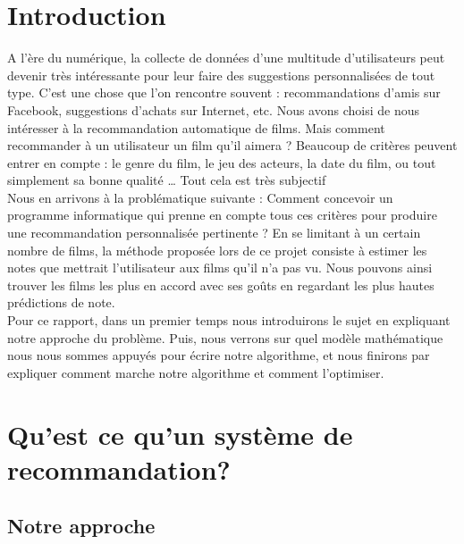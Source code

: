 \documentclass[a4paper,10pt]{article}
\begin{document}
\renewcommand{\contentsname}{Sommaire}
\tableofcontents
\newpage

\renewcommand{\thepage}{\arabic{page}}
\setcounter{page}{1}

\section*{Introduction}

A l’ère du numérique, la collecte de données d’une multitude d’utilisateurs peut devenir très intéressante pour leur faire des suggestions 
personnalisées de tout type. C’est une chose que l’on rencontre souvent : recommandations d’amis sur Facebook, suggestions d’achats sur Internet, etc.
Nous avons choisi de nous intéresser à la recommandation automatique de films.
Mais comment recommander à un utilisateur un film qu’il aimera ? Beaucoup de critères peuvent entrer en compte : 
le genre du film, le jeu des acteurs, la date du film, ou tout simplement sa bonne qualité … Tout cela est très subjectif \! \\


Nous en arrivons à la problématique suivante : Comment concevoir un programme informatique 
qui prenne en compte tous ces critères pour produire une recommandation personnalisée pertinente ?
En se limitant à un certain nombre de films, la méthode proposée lors de ce projet consiste à estimer les notes que mettrait l’utilisateur aux films qu'il n'a pas vu.
Nous pouvons ainsi trouver les films les plus en accord avec ses goûts en regardant les plus hautes prédictions de note.\\
Pour ce rapport, dans un premier temps nous introduirons le sujet en expliquant notre approche du problème.
Puis, nous verrons sur quel modèle mathématique nous nous sommes appuyés pour écrire notre algorithme, et nous finirons par expliquer comment marche notre algorithme et comment l’optimiser.

\section{Qu'est ce qu'un système de recommandation?}

\subsection{Notre approche}
\end{document}
